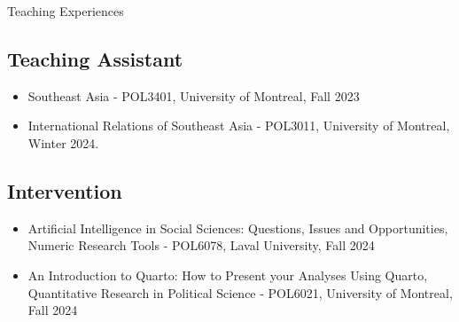 \documentclass{resume} %
\begin{document}
\begin{rSection}{Teaching Experiences}
    \subsection*{Teaching Assistant}
        \begin{itemize}
            \item Southeast Asia - POL3401, University of Montreal, Fall 2023
            \item International Relations of Southeast Asia - POL3011, University of Montreal, Winter 2024.
        \end{itemize}
    \subsection*{Intervention}
        \begin{itemize}
            \item Artificial Intelligence in Social Sciences: Questions, Issues and Opportunities, Numeric Research Tools - POL6078, Laval University, Fall 2024
            \item An Introduction to Quarto: How to Present your Analyses Using Quarto, Quantitative Research in Political Science - POL6021, University of Montreal, Fall 2024
        \end{itemize}
        
\end{rSection}

\end{document}
